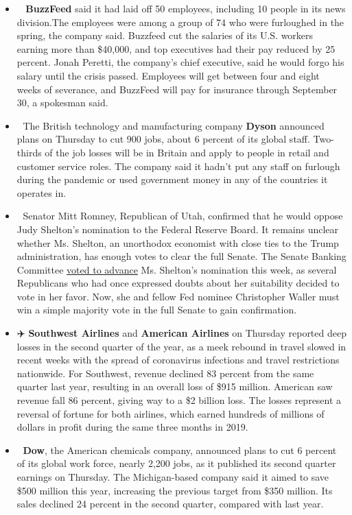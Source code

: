 \begin{itemize}
\item
  🤳🏻 \textbf{BuzzFeed} said it had laid off 50 employees, including 10
  people in its news division.The employees were among a group of 74 who
  were furloughed in the spring, the company said. Buzzfeed cut the
  salaries of its U.S. workers earning more than \$40,000, and top
  executives had their pay reduced by 25 percent. Jonah Peretti, the
  company's chief executive, said he would forgo his salary until the
  crisis passed. Employees will get between four and eight weeks of
  severance, and BuzzFeed will pay for insurance through September 30, a
  spokesman said.
\item
  🧹 The British technology and manufacturing company \textbf{Dyson}
  announced plans on Thursday to cut 900 jobs, about 6 percent of its
  global staff. Two-thirds of the job losses will be in Britain and
  apply to people in retail and customer service roles. The company said
  it hadn't put any staff on furlough during the pandemic or used
  government money in any of the countries it operates in.
\item
  🏦 Senator Mitt Romney, Republican of Utah, confirmed that he would
  oppose Judy Shelton's nomination to the Federal Reserve Board. It
  remains unclear whether Ms. Shelton, an unorthodox economist with
  close ties to the Trump administration, has enough votes to clear the
  full Senate. The Senate Banking Committee
  \href{https://www.nytimes.com/2020/07/21/business/economy/shelton-federal-reserve-trump-senate.html}{voted
  to advance} Ms. Shelton's nomination this week, as several Republicans
  who had once expressed doubts about her suitability decided to vote in
  her favor. Now, she and fellow Fed nominee Christopher Waller must win
  a simple majority vote in the full Senate to gain confirmation.
\item
  ✈️ \textbf{Southwest Airlines} and \textbf{American Airlines} on
  Thursday reported deep losses in the second quarter of the year, as a
  meek rebound in travel slowed in recent weeks with the spread of
  coronavirus infections and travel restrictions nationwide. For
  Southwest, revenue declined 83 percent from the same quarter last
  year, resulting in an overall loss of \$915 million. American saw
  revenue fall 86 percent, giving way to a \$2 billion loss. The losses
  represent a reversal of fortune for both airlines, which earned
  hundreds of millions of dollars in profit during the same three months
  in 2019.
\item
  🧪 \textbf{Dow}, the American chemicals company, announced plans to cut
  6 percent of its global work force, nearly 2,200 jobs, as it published
  its second quarter earnings on Thursday. The Michigan-based company
  said it aimed to save \$500 million this year, increasing the previous
  target from \$350 million. Its sales declined 24 percent in the second
  quarter, compared with last year.
\end{itemize}

